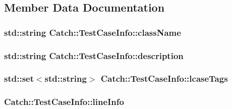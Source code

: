 \subsection{Member Data Documentation}
\hypertarget{structCatch_1_1TestCaseInfo_a1a5e0825132a38d091defdebbf2f8ce9}{
\subsubsection[{class\-Name}]{\setlength{\rightskip}{0pt plus 5cm}std\-::string Catch\-::\-Test\-Case\-Info\-::class\-Name}}\label{structCatch_1_1TestCaseInfo_a1a5e0825132a38d091defdebbf2f8ce9}
\hypertarget{structCatch_1_1TestCaseInfo_a37fe2db9425bc45f6a33893eac31198e}{
\subsubsection[{description}]{\setlength{\rightskip}{0pt plus 5cm}std\-::string Catch\-::\-Test\-Case\-Info\-::description}}\label{structCatch_1_1TestCaseInfo_a37fe2db9425bc45f6a33893eac31198e}
\hypertarget{structCatch_1_1TestCaseInfo_a0ed3864a313e8ddc3ae38431be5be9ae}{
\subsubsection[{lcase\-Tags}]{\setlength{\rightskip}{0pt plus 5cm}std\-::set$<$std\-::string$>$ Catch\-::\-Test\-Case\-Info\-::lcase\-Tags}}\label{structCatch_1_1TestCaseInfo_a0ed3864a313e8ddc3ae38431be5be9ae}
\hypertarget{structCatch_1_1TestCaseInfo_aa9407b7f442655b51a2aad24b3fa2fd3}{
\subsubsection[{line\-Info}]{ Catch\-::\-Test\-Case\-Info\-::line\-Info}}\label{structCatch_1_1TestCaseInfo_aa9407b7f442655b51a2aad24b3fa2fd3}
